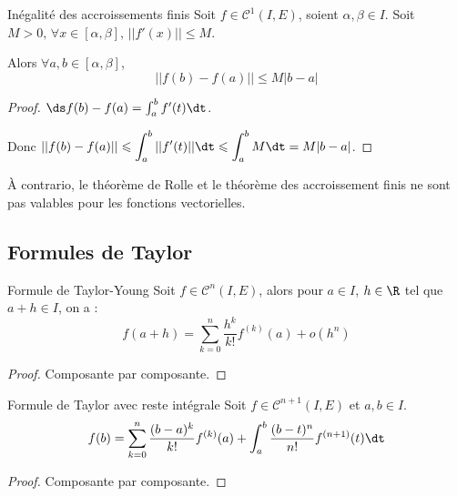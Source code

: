 \begin{theoreme}{Inégalité des accroissements finis}{}
    Soit $f \in \mathscr C^1(I, E)$, soient $\alpha,\beta \in I$. Soit $M > 0, \, \forall x \in [\alpha,\beta], \, ||f'(x)|| \leqslant M$.

    Alors $\forall a, b \in [\alpha,\beta]$, 
    \[||f(b) - f(a)|| \leqslant M |b - a|\]
\end{theoreme}


\begin{proof}
    $\ds f(b) - f(a) = \int_a^b f'(t) \dt$.

    Donc $\displaystyle ||f(b) - f(a)|| \leqslant \int_a^b ||f'(t)|| \dt \leqslant \int_a^b M \dt = M |b - a|$.
\end{proof}

\begin{remarque}
    À contrario, le théorème de Rolle et le théorème des accroissement finis ne sont pas valables pour les fonctions vectorielles.
\end{remarque}

\subsection{Formules de Taylor}


\begin{proposition}{Formule de Taylor-Young}{}
    Soit $f \in \mathscr C^n(I, E)$, alors pour $a \in I$, $h \in \R$ tel que $a + h \in I$, on a :
    \[f(a + h) = \sum_{k = 0 }^{n } \frac{h^k}{k!} f^{(k)}(a) + o(h^n)\]
\end{proposition}

\begin{proof}
    Composante par composante.
\end{proof}

\begin{proposition}{Formule de Taylor avec reste intégrale}{}
    Soit $f \in \mathscr C^{n + 1}(I, E)$ et $a, b \in I$. 
    \[f(b) = \sum_{k = 0 }^{n } \frac{(b - a)^k}{k!} f^{(k)}(a) + \int_a^b \frac{(b - t)^n}{n!} f^{(n+1)}(t) \dt\]
\end{proposition}

\begin{proof}
    Composante par composante.
\end{proof}

